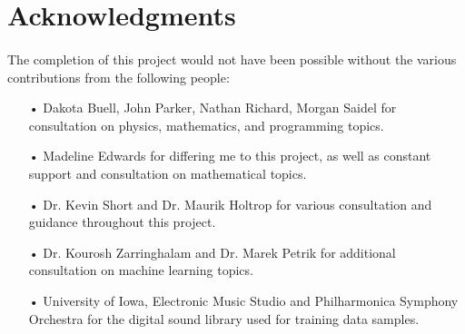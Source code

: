 \documentclass[12pt,letterpaper]{article}
\begin{document}

\newpage
\section{Acknowledgments}
\label{sec-Acknowledge}

\paragraph*{}The completion of this project would not have been possible without the various contributions from the following people:

\begin{itemize}

\item[•]Dakota Buell, John Parker, Nathan Richard, Morgan Saidel for consultation on physics, mathematics, and programming topics.

\item[•]Madeline Edwards for differing me to this project, as well as constant support and consultation on mathematical topics.

\item[•]Dr. Kevin Short and Dr. Maurik Holtrop for various consultation and guidance throughout this project.

\item[•]Dr. Kourosh Zarringhalam and Dr. Marek Petrik for additional consultation on machine learning topics.

\item[•]University of Iowa, Electronic Music Studio and Philharmonica Symphony Orchestra for the digital sound library used for training data samples.

\end{itemize}


\newpage
\end{document}
